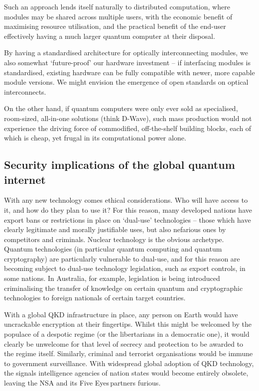 \documentclass[aps, rmp, twocolumn, amsmath, amssymb, nofootinbib, superscriptaddress, longbibliography, floatfix, table-of-contents, eqsecnum]{revtex4-1}
\begin{document}
Such an approach lends itself naturally to distributed computation, where modules may be shared across multiple users, with the economic benefit of maximising resource utilisation, and the practical benefit of the end-user effectively having a much larger quantum computer at their disposal.

By having a standardised architecture for optically interconnecting modules, we also somewhat `future-proof' our hardware investment -- if interfacing modules is standardised, existing hardware can be fully compatible with newer, more capable module versions. We might envision the emergence of open standards on optical interconnects.

On the other hand, if quantum computers were only ever sold as specialised, room-sized, all-in-one solutions (think D-Wave\texttrademark), such mass production would not experience the driving force of commodified, off-the-shelf building blocks, each of which is cheap, yet frugal in its computational power alone.

%
%

\subsection{Security implications of the global quantum internet} \label{sec:sec_imp} 

With any new technology comes ethical considerations. Who will have access to it, and how do they plan to use it? For this reason, many developed nations have export bans or restrictions in place on `dual-use' technologies -- those which have clearly legitimate and morally justifiable uses, but also nefarious ones by competitors and criminals. Nuclear technology is the obvious archetype. Quantum technologies (in particular quantum computing and quantum cryptography) are particularly vulnerable to dual-use, and for this reason are becoming subject to dual-use technology legislation, such as export controls, in some nations. In Australia, for example, legislation is being introduced criminalising the transfer of knowledge on certain quantum and cryptographic technologies to foreign nationals of certain target countries.

With a global QKD infrastructure in place, any person on Earth would have uncrackable encryption at their fingertips. Whilst this might be welcomed by the populace of a despotic regime (or the libertarians in a democratic one), it would clearly be unwelcome for that level of secrecy and protection to be awarded to the regime itself. Similarly, criminal and terrorist organisations would be immune to government surveillance. With widespread global adoption of QKD technology, the signals intelligence agencies of nation states would become entirely obsolete, leaving the NSA and its Five Eyes\texttrademark \,partners furious.
\end{document}
